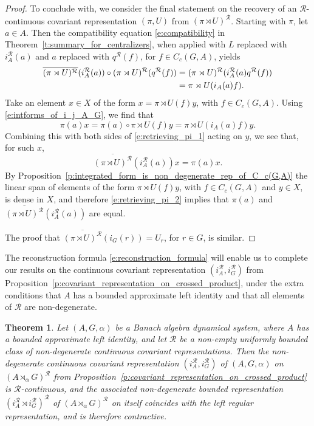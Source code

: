 \documentclass{amsart}
\theoremstyle{plain}
\newtheorem{theorem}{Theorem}[section]
\theoremstyle{definition}
\numberwithin{equation}{section}
\begin{document}
\begin{proof}
To conclude with, we consider the final statement on the recovery of an ${\mathcal R}$-continuous covariant representation ${(\pi,U)}$ from $({\pi \rtimes U})^{\mathcal R}$.
Starting with $\pi$, let $a\in A$. Then the compatibility equation \eqref{e:compatibility} in Theorem~\ref{t:summary_for_centralizers}, when applied with $L$ replaced with $i_A^{\mathcal R}(a)$ and $a$ replaced with ${q^{\mathcal R}}(f)$, for $f\in C_c(G,A)$, yields
\begin{align}\label{e:retrieving_pi_1}
\overline{({\pi \rtimes U})^{\mathcal R}}(i_A^{\mathcal R}(a))\circ({\pi \rtimes U})^{\mathcal R}({q^{\mathcal R}}(f)) &= ({\pi \rtimes U} )^{\mathcal R} (i_A^{\mathcal R}(a){q^{\mathcal R}}(f)) \notag \\
&= {\pi \rtimes U}(i_A(a)f).
\end{align}
Take an element $x \in X$ of the form $x = {\pi \rtimes U}(f) y$, with $f\in C_c(G,A)$. Using \eqref{e:intforms_of_i_j_A_G}, we find that
\[
\pi(a)x = \pi(a) \circ {\pi \rtimes U}(f)y = {\pi \rtimes U}(i_A(a)f)y.
\]
Combining this with both sides of \eqref{e:retrieving_pi_1} acting on $y$, we see that, for such $x$,
\begin{equation}\label{e:retrieving_pi_2}
\overline{({\pi \rtimes U})^{\mathcal R}}(i_A^{\mathcal R}(a))x=\pi(a)x.
\end{equation}
By Proposition~\ref{p:integrated_form_is_non_degenerate_rep_of_C_c(G,A)} the linear span of elements of the form ${\pi \rtimes U}(f)y$, with $f\in C_c(G,A)$ and $y\in X$, is dense in $X$, and therefore \eqref{e:retrieving_pi_2} implies that $\pi(a)$ and $\overline{({\pi \rtimes U})^{\mathcal R}}(i_A^{\mathcal R}(a))$ are equal.

The proof that $\overline{({\pi \rtimes U})^{\mathcal R}}(i_G(r)) = U_r$, for $r \in G$, is similar.
\end{proof}

The reconstruction formula \eqref{e:reconstruction_formula} will enable us to complete our results on the continuous covariant representation $(i_A^{\mathcal R} , i_G^{\mathcal R})$ from Proposition~\ref{p:covariant_representation_on_crossed_product}, under the extra conditions that $A$ has a bounded approximate left identity and that all elements of ${\mathcal R}$ are non-degenerate.

\begin{theorem}\label{t:integrated_form_of_representation_as_left_centralizers_is_canonical}
Let ${(A,G,\alpha)}$ be a Banach algebra dynamical system, where $A$ has a bounded approximate left identity, and let $\mathcal{R}$ be a non-empty uniformly bounded class of non-degenerate continuous covariant representations. Then the non-degenerate continuous covariant representation $(i_A^{\mathcal R}, i_G^{\mathcal R})$ of ${(A,G,\alpha)}$ on ${(A {\rtimes}_\alpha G)^\mathcal{R}}$ from Proposition~\ref{p:covariant_representation_on_crossed_product} is ${\mathcal R}$-continuous, and the associated non-degenerate bounded representation $(i_A^{\mathcal R} {\rtimes} i_G^{\mathcal R})^{\mathcal R}$ of ${(A {\rtimes}_\alpha G)^\mathcal{R}}$ on itself coincides with the left regular representation, and is therefore contractive.
\end{theorem}
\end{document}
